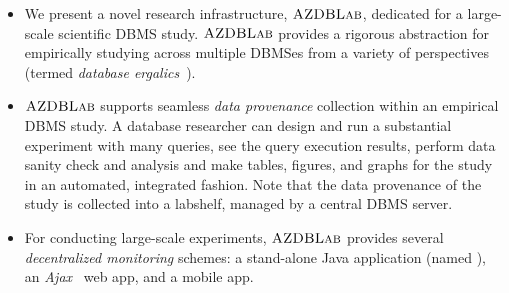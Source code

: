 \documentclass{vldb}
\def\azdb{\hbox{\sc AZDBLab}}
\begin{document}
\begin{itemize}
\item  We present a novel research infrastructure, $\azdb$, dedicated for a large-scale scientific DBMS study. 
\linebreak $\azdb$ provides a rigorous \hbox{abstraction} for \linebreak \hbox{empirically} \hbox{studying} across
multiple \hbox{DBMSes}  from a \linebreak \hbox{variety} of \hbox{perspectives} (termed {\em database ergalics}~\cite{ergalics}).


\item $\azdb$ supports seamless {\em data provenance} \linebreak \hbox{collection} within an \hbox{empirical} DBMS study. 
A \linebreak database \hbox{researcher} can \hbox{design} and run a substantial \hbox{experiment} with many queries, 
see the query \hbox{execution} \hbox{results}, perform data \hbox{sanity} check and \hbox{analysis} and 
make tables, figures, and graphs for the study in an \hbox{automated}, \hbox{integrated} \hbox{fashion}. 
Note that the data provenance of the study is collected into a \hbox{labshelf}, 
\hbox{managed} by a \hbox{central} DBMS server. %

\item For conducting large-scale experiments, $\azdb$ \linebreak \hbox{provides} several {\em decentralized \hbox{monitoring}} \linebreak schemes: 
a stand-alone Java application (named ), 
an {\em Ajax}~\cite{ajax} web app, and a mobile app.


\end{itemize}
\end{document}
